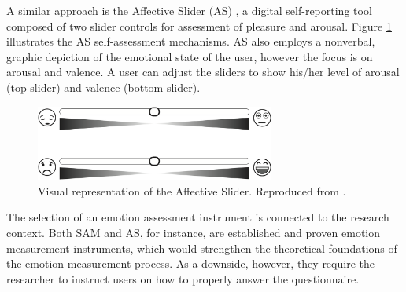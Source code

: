 A similar approach is the Affective Slider (AS) \parencite{betella2016affective}, a digital self-reporting tool composed of two slider controls for assessment of pleasure and arousal. Figure \ref{fig:as} illustrates the AS self-assessment mechanisms. AS also employs a nonverbal, graphic depiction of the emotional state of the user, however the focus is on arousal and valence. A user can adjust the sliders to show his/her level of arousal (top slider) and valence (bottom slider).

\begin{figure}[h]
    \centering
    \includegraphics[width=0.7\textwidth]{Content/figures/AS.png}
    \caption{Visual representation of the Affective Slider. Reproduced from \textcite{betella2016affective}.}
    \label{fig:as}
\end{figure}

The selection of an emotion assessment instrument is connected to the research context. Both SAM and AS, for instance, are established and proven emotion measurement instruments, which would strengthen the theoretical foundations of the emotion measurement process. As a downside, however, they require the researcher to instruct users on how to properly answer the questionnaire.
